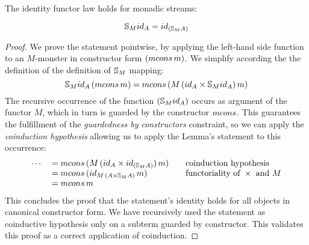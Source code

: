 \begin{lemma}\label{lemma:functor_id}
The identity functor law holds for monadic streams:

$$
\stream{M} \id_A = \id_{(\stream{M} A)}
$$

\end{lemma}
\begin{proof}
We prove the statement pointwise, by applying the left-hand side function to an $M$-monster in constructor form $(\mcons\,m)$.
We simplify according the the definition of the definition of $\mathbb{S}_{M}$ mapping:
$$
\stream{M} \id_A\,(\mcons\,m)
= \mcons\,(M\,(\id_A\times \stream{M} \id_A)\,m)
$$
The recursive occurrence of the function $(\stream{M} \id_A)$ occurs as argument of the functor $M$, which in turn is guarded by the constructor $\mcons$.
This guarantees the fulfillment of the {\em guardedness by constructors} constraint, so we can apply the {\em coinduction hypothesis} allowing us to apply the Lemma's statement to this occurrence:
$$
\begin{array}{rl@{\qquad}l}
\cdots
& {}= \mcons\,(M\,(\id_A\times \id_{(\stream{M} A)})\,m)
  & \mbox{coinduction hypothesis}\\
& {}= \mcons\,(\id_{M\,(A\times \stream{M} A)}\,m)
  & \mbox{functoriality of }\times\mbox{ and }M\\
& {}= \mcons\,m
\end{array}
$$
This concludes the proof that the statement's identity holds for all objects in canonical constructor form.
We have recursively used the statement as coinductive hypothesis only on a subterm guarded by constructor.
This validates this proof as a correct application of coinduction.
\end{proof}


